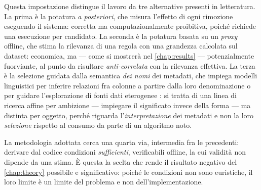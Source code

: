Questa impostazione distingue il lavoro da tre alternative presenti in letteratura. La prima è la
potatura \emph{a posteriori}, che misura l'effetto di ogni rimozione eseguendo il sistema:
corretta ma computazionalmente proibitiva, poiché richiede una esecuzione per candidato. La
seconda è la potatura basata su un \emph{proxy} offline, che stima la rilevanza di una regola con
una grandezza calcolata sul dataset: economica, ma --- come si mostrerà nel \autoref{chap:results}
--- potenzialmente fuorviante, al punto da risultare \emph{anti-correlata} con la rilevanza
effettiva. La terza è la selezione guidata dalla semantica \emph{dei nomi} dei metadati, che
impiega modelli linguistici per inferire relazioni fra colonne a partire dalla loro
denominazione \cite{trummer2024llmcorrelations} o per guidare l'esplorazione di fonti dati
eterogenee \cite{freire2024llmdiscovery}: si tratta di una linea di ricerca affine per ambizione
--- impiegare il significato invece della forma --- ma distinta per oggetto, perché riguarda
l'\emph{interpretazione} dei metadati e non la loro \emph{selezione} rispetto al consumo da parte
di un algoritmo noto.

La metodologia adottata cerca una quarta via, intermedia fra le precedenti: derivare dal codice
condizioni \emph{sufficienti}, verificabili offline, la cui validità non dipende da una stima. È
questa la scelta che rende il risultato negativo del \autoref{chap:theory} possibile e
significativo: poiché le condizioni non sono euristiche, il loro limite è un limite del problema e
non dell'implementazione.
